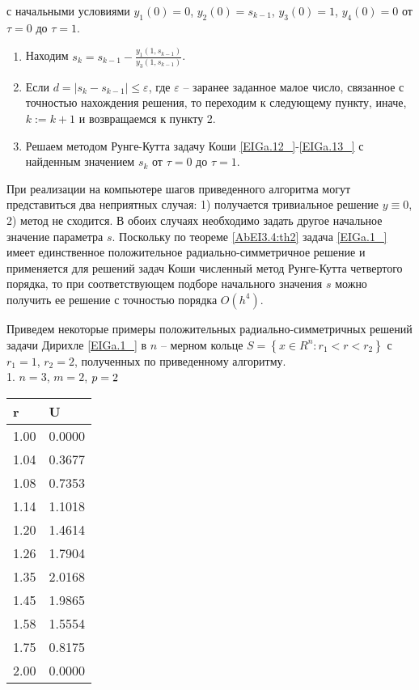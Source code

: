 с начальными условиями $y_{1} \left(0\right)=0$, $y_{2} \left(0\right)=s_{k-1}$, $y_{3} \left(0\right)=1$, $y_{4} \left(0\right)=0$ от $\tau =0$ до $\tau =1$.

\begin{enumerate}[1) ]
\item  Находим $s_{k} =s_{k-1} -\frac{y_{1} (1,s_{k-1} )}{y_{3} (1,s_{k-1} )} $.

\item  Если $d=\left|s_{k} -s_{k-1} \right|\le \varepsilon $, где $\varepsilon $ -- заранее заданное малое число, связанное с точностью нахождения решения, то переходим к следующему пункту, иначе, $k:=k+1$ и возвращаемся к пункту 2.

\item  Решаем методом Рунге-Кутта задачу Коши \eqref{EIGa.12_}-\eqref{EIGa.13_} с найденным значением $s_{k} $ от $\tau =0$ до $\tau =1$.
\end{enumerate}

При реализации на компьютере шагов приведенного алгоритма могут представиться два неприятных случая: 1) получается тривиальное решение $y\equiv 0$, 2) метод не сходится. В обоих случаях необходимо задать другое начальное значение параметра $s$. Поскольку по теореме \ref{AbEI3.4:th2} задача \eqref{EIGa.1_} имеет единственное положительное радиально-симметричное решение и применяется для решений задач Коши численный метод Рунге-Кутта четвертого порядка, то при соответствующем подборе начального значения $s$ можно получить ее решение с точностью порядка $O(h^4)$.

Приведем некоторые примеры положительных радиально-симметричных решений задачи Дирихле \eqref{EIGa.1_} в $n$ -- мерном кольце $S=\left\{x\in R^{n} :r_{1} <r<r_{2} \right\}$  с $r_1=1$,  $r_2=2$, полученных по приведенному
алгоритму.
$$ $$
1. $n=3$, $m=2$, $p=2 \\$

\begin{tabular}{|p{0.8in}|p{0.9in}|} \hline
r & U \\ \hline
1.00 & 0.0000 \\ \hline
1.04 & 0.3677 \\ \hline
1.08 & 0.7353 \\ \hline
1.14 & 1.1018  \\ \hline
1.20 & 1.4614  \\ \hline
1.26 & 1.7904  \\ \hline
1.35  & 2.0168   \\ \hline
1.45 & 1.9865 \\ \hline
1.58 & 1.5554 \\ \hline
1.75 & 0.8175 \\ \hline
2.00  & 0.0000 \\ \hline
\end{tabular}

